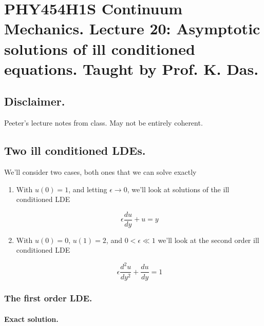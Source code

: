 
%

\chapter{PHY454H1S Continuum Mechanics.  Lecture 20: Asymptotic solutions of ill conditioned equations.  Taught by Prof. K. Das.}
\label{chap:continuumL20}
{}
\date{Mar 28, 2012}

\beginArtWithToc

\section{Disclaimer.}

Peeter's lecture notes from class.  May not be entirely coherent.

\section{Two ill conditioned LDEs.}

We'll consider two cases, both ones that we can solve exactly

\begin{enumerate}
\item With $u(0) = 1$, and letting $\epsilon \rightarrow 0$, we'll look at solutions of the ill conditioned LDE

\begin{equation}\label{eqn:continuumL20:10}
\epsilon \frac{du}{dy} + u = y
\end{equation}

\item With $u(0) = 0$, $u(1) = 2$, and $0 < \epsilon \ll 1$ we'll look at the second order ill conditioned LDE

\begin{equation}\label{eqn:continuumL20:30}
\epsilon \frac{d^2u}{dy^2} + \frac{du}{dy} = 1
\end{equation}
\end{enumerate}

\subsection{The first order LDE.}
\subsubsection{Exact solution.}

